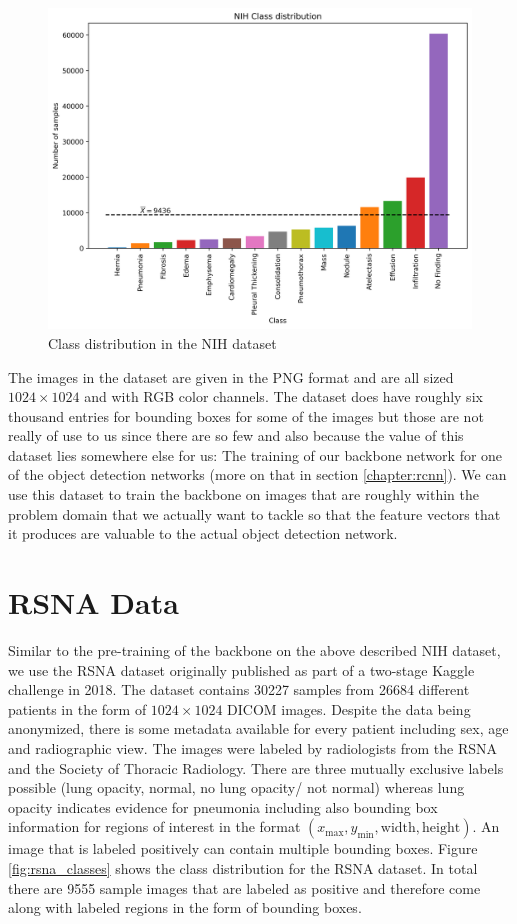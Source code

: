 \begin{figure}
	\centering
	\includegraphics[width=.8\linewidth]{img/nih_class_distribution.png}
	\caption{Class distribution in the NIH dataset}
	\label{fig:nih_classes}
\end{figure}

The images in the dataset are given in the PNG format and are all sized $1024 \times 1024$ and with RGB color channels. The dataset does have roughly six thousand entries for bounding boxes for some of the images but those are not really of use to us since there are so few and also because the value of this dataset lies somewhere else for us: The training of our backbone network for one of the object detection networks (more on that in section \vref{chapter:rcnn}). We can use this dataset to train the backbone on images that are roughly within the problem domain that we actually want to tackle so that the feature vectors that it produces are valuable to the actual object detection network. 

\section{RSNA Data}\label{data:rsna}

Similar to the pre-training of the backbone on the above described NIH dataset, we use the \ac{RSNA} dataset \autocite{RSNAKaeggle} originally published as part of a two-stage Kaggle challenge in 2018. The dataset contains \num{30227} samples from \num{26684} different patients in the form of $1024 \times 1024$ DICOM images. Despite the data being anonymized, there is some metadata available for every patient including sex, age and radiographic view. The images were labeled by radiologists from the \ac{RSNA} and the Society of Thoracic Radiology. There are three mutually exclusive labels possible (lung opacity, normal, no lung opacity/ not normal) whereas lung opacity indicates evidence for pneumonia including also bounding box information for regions of interest in the format $(x_{\text{max}}, y_{\text{min}}, \text{width}, \text{height})$. An image that is labeled positively can contain multiple bounding boxes. Figure \ref{fig:rsna_classes} shows the class distribution for the \ac{RSNA} dataset. In total there are \num{9555} sample images that are labeled as positive and therefore come along with labeled regions in the form of bounding boxes.

